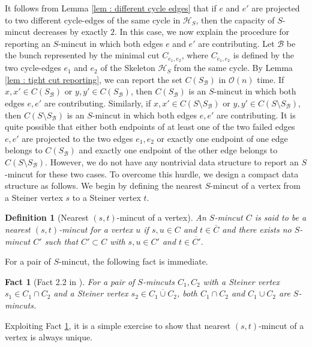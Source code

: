 \documentclass[letterpaper,11pt]{article}
\newtheorem{fact}{Fact}[]
\newtheorem{definition}{Definition}[]
\begin{document}
It follows from Lemma \ref{lem : different cycle edges} that if $e$ and $e'$ are projected to two different cycle-edges of the same cycle in ${\mathcal H}_S$, then the capacity of $S$-mincut decreases by exactly $2$. In this case, we now explain the procedure for reporting an $S$-mincut in which both edges $e$ and $e'$ are contributing. Let ${\mathcal B}$ be the bunch represented by the minimal cut $C_{e_1,e_2}$, where $C_{e_1,e_2}$ is defined by the two cycle-edges $e_1$ and $e_2$ of the Skeleton ${\mathcal H}_S$ from the same cycle. By Lemma \ref{lem : tight cut reporting}, we can report the set $C(S_{\mathcal B})$ in ${\mathcal O}(n)$ time. 
If $x,x'\in C(S_{\mathcal B})$ or $y,y'\in C(S_{\mathcal B})$, then $C(S_{\mathcal B})$ is an $S$-mincut in which both edges $e,e'$ are contributing. Similarly, if $x,x'\in C(S\setminus S_{\mathcal B})$ or $y,y'\in C(S\setminus S_{\mathcal B})$, then $C(S\setminus S_{\mathcal B})$ is an $S$-mincut in which both edges $e,e'$ are contributing.
It is quite possible that either both endpoints of at least one of the two failed edges $e,e'$ are projected to the two edges $e_1,e_2$ or exactly one endpoint of one edge belongs to $C(S_{\mathcal B})$ and exactly one endpoint of the other edge belongs to $C(S\setminus S_{\mathcal B})$.
However, we do not have any nontrivial data structure to report an $S$-mincut for these two cases. To overcome this hurdle, we design a compact data structure as follows.
We begin by defining the nearest $S$-mincut of a vertex from a Steiner vertex $s$ to a Steiner vertex $t$.
\begin{definition} [Nearest $(s,t)$-mincut of a vertex] \label{def : nearest s,t mincut of a vertex}
     An $S$-mincut $C$ is said to be a nearest $(s,t)$-mincut for a vertex $u$ if $s,u\in C$ and $t\in \overline{C}$ and there exists no $S$-mincut $C'$ such that $C'\subset C$ with $s,u\in C'$ and $t\in \overline{C'}$.
\end{definition}
For a pair of $S$-mincut, the following fact is immediate.
\begin{fact}[Fact 2.2 in \cite{DBLP:journals/siamcomp/DinitzV00}] \label{fact : closed under intersection and union}
    For a pair of $S$-mincuts $C_1,C_2$ with a Steiner vertex $s_1\in C_1\cap C_2$ and a Steiner vertex $s_2\in \overline{C_1\cup C_2}$, both $C_1\cap C_2$ and $C_1\cup C_2$ are $S$-mincuts. 
\end{fact}
Exploiting Fact \ref{fact : closed under intersection and union}, it is a simple exercise to show that nearest $(s,t)$-mincut of a vertex is always unique.
\end{document}
